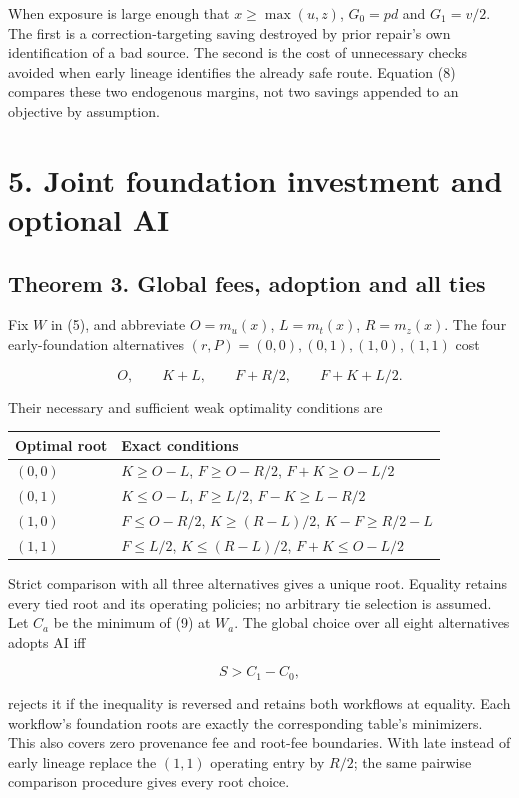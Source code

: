 \documentclass[
  11pt,
  a4paper,
]{article}
\begin{document}
When exposure is large enough that \(x\geq\max(u,z)\), \(G_0=pd\) and
\(G_1=v/2\). The first is a correction-targeting saving destroyed by
prior repair's own identification of a bad source. The second is the
cost of unnecessary checks avoided when early lineage identifies the
already safe route. Equation (8) compares these two endogenous margins,
not two savings appended to an objective by assumption.

\section{5. Joint foundation investment and optional
AI}\label{joint-foundation-investment-and-optional-ai}

\subsection{Theorem 3. Global fees, adoption and all
ties}\label{theorem-3.-global-fees-adoption-and-all-ties}

Fix \(W\) in (5), and abbreviate \(O=m_u(x)\), \(L=m_t(x)\),
\(R=m_z(x)\). The four early-foundation alternatives
\((r,P)=(0,0),(0,1),(1,0),(1,1)\) cost

\[O,\qquad K+L,\qquad F+R/2,\qquad F+K+L/2.\tag{9}\]

Their necessary and sufficient weak optimality conditions are

\begin{longtable}[]{@{}ll@{}}
\toprule\noalign{}
Optimal root & Exact conditions \\
\midrule\noalign{}
\endhead
\bottomrule\noalign{}
\endlastfoot
\((0,0)\) & \(K\geq O-L\), \(F\geq O-R/2\), \(F+K\geq O-L/2\) \\
\((0,1)\) & \(K\leq O-L\), \(F\geq L/2\), \(F-K\geq L-R/2\) \\
\((1,0)\) & \(F\leq O-R/2\), \(K\geq(R-L)/2\), \(K-F\geq R/2-L\) \\
\((1,1)\) & \(F\leq L/2\), \(K\leq(R-L)/2\), \(F+K\leq O-L/2\) \\
\end{longtable}

Strict comparison with all three alternatives gives a unique root.
Equality retains every tied root and its operating policies; no
arbitrary tie selection is assumed. Let \(C_a\) be the minimum of (9) at
\(W_a\). The global choice over all eight alternatives adopts AI iff

\[S>C_1-C_0,\tag{10}\]

rejects it if the inequality is reversed and retains both workflows at
equality. Each workflow's foundation roots are exactly the corresponding
table's minimizers. This also covers zero provenance fee and root-fee
boundaries. With late instead of early lineage replace the \((1,1)\)
operating entry by \(R/2\); the same pairwise comparison procedure gives
every root choice.
\end{document}
